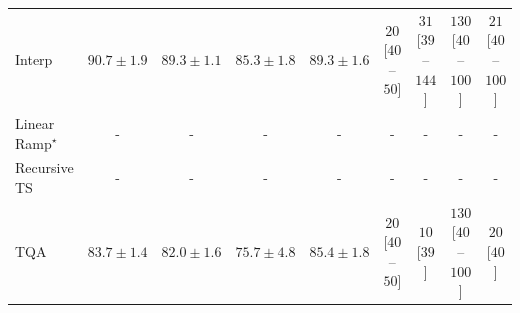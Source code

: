 \begin{tabular}{l|cccc|cccc|}
Interp & {\cellcolor[HTML]{006435}} \color[HTML]{F1F1F1} $90.7\pm 1.9$ & {\cellcolor[HTML]{0B713B}} \color[HTML]{F1F1F1} $89.3\pm 1.1$ & {\cellcolor[HTML]{369D54}} \color[HTML]{F1F1F1} $85.3\pm 1.8$ & {\cellcolor[HTML]{0B713B}} \color[HTML]{F1F1F1} $89.3\pm 1.6$ & {\cellcolor[HTML]{FFF5F1}} \color[HTML]{000000} $20$ [$40$--$50$] & {\cellcolor[HTML]{FFF3EF}} \color[HTML]{000000} $31$ [$39$--$144$] & {\cellcolor[HTML]{FDDBD7}} \color[HTML]{000000} $130$ [$40$--$100$] & {\cellcolor[HTML]{FFF5F1}} \color[HTML]{000000} $21$ [$40$--$100$] \\
Linear Ramp$^\star$ & {\cellcolor[HTML]{000000}} \color[HTML]{F1F1F1} {\cellcolor{white}} \color{black} - & {\cellcolor[HTML]{000000}} \color[HTML]{F1F1F1} {\cellcolor{white}} \color{black} - & {\cellcolor[HTML]{000000}} \color[HTML]{F1F1F1} {\cellcolor{white}} \color{black} - & {\cellcolor[HTML]{000000}} \color[HTML]{F1F1F1} {\cellcolor{white}} \color{black} - & {\cellcolor[HTML]{000000}} \color[HTML]{F1F1F1} {\cellcolor{white}} \color{black} - & {\cellcolor[HTML]{000000}} \color[HTML]{F1F1F1} {\cellcolor{white}} \color{black} - & {\cellcolor[HTML]{000000}} \color[HTML]{F1F1F1} {\cellcolor{white}} \color{black} - & {\cellcolor[HTML]{000000}} \color[HTML]{F1F1F1} {\cellcolor{white}} \color{black} - \\
Recursive TS & {\cellcolor[HTML]{000000}} \color[HTML]{F1F1F1} {\cellcolor{white}} \color{black} - & {\cellcolor[HTML]{000000}} \color[HTML]{F1F1F1} {\cellcolor{white}} \color{black} - & {\cellcolor[HTML]{000000}} \color[HTML]{F1F1F1} {\cellcolor{white}} \color{black} - & {\cellcolor[HTML]{000000}} \color[HTML]{F1F1F1} {\cellcolor{white}} \color{black} - & {\cellcolor[HTML]{000000}} \color[HTML]{F1F1F1} {\cellcolor{white}} \color{black} - & {\cellcolor[HTML]{000000}} \color[HTML]{F1F1F1} {\cellcolor{white}} \color{black} - & {\cellcolor[HTML]{000000}} \color[HTML]{F1F1F1} {\cellcolor{white}} \color{black} - & {\cellcolor[HTML]{000000}} \color[HTML]{F1F1F1} {\cellcolor{white}} \color{black} - \\
TQA & {\cellcolor[HTML]{4AB062}} \color[HTML]{F1F1F1} $83.7\pm 1.4$ & {\cellcolor[HTML]{69BF72}} \color[HTML]{000000} $82.0\pm 1.6$ & {\cellcolor[HTML]{CFEC9E}} \color[HTML]{000000} $75.7\pm 4.8$ & {\cellcolor[HTML]{359C53}} \color[HTML]{F1F1F1} $85.4\pm 1.8$ & {\cellcolor[HTML]{FFF5F1}} \color[HTML]{000000} $20$ [$40$--$50$] & {\cellcolor[HTML]{FFF7F3}} \color[HTML]{000000} $10$ [$39$] & {\cellcolor[HTML]{FDDBD7}} \color[HTML]{000000} $130$ [$40$--$100$] & {\cellcolor[HTML]{FFF5F1}} \color[HTML]{000000} $20$ [$40$] \\

\end{tabular}
